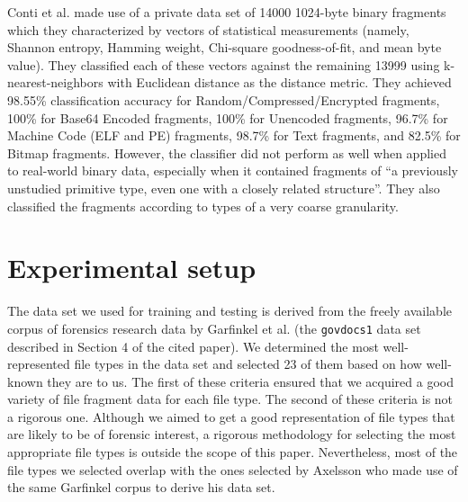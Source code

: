 \documentclass[letter,11pt]{article}
\begin{document}
Conti et al. \cite{Conti10} made use of a private data set of 14000 1024-byte binary fragments which they characterized by vectors of statistical measurements (namely, Shannon entropy, Hamming weight, Chi-square goodness-of-fit, and mean byte value). They classified each of these vectors against the remaining 13999 using k-nearest-neighbors with Euclidean distance as the distance metric. They achieved 98.55\% classification accuracy for Random/Compressed/Encrypted fragments, 100\% for Base64 Encoded fragments, 100\% for Unencoded fragments, 96.7\% for Machine Code (ELF and PE) fragments, 98.7\% for Text fragments, and 82.5\% for Bitmap fragments. However, the classifier did not perform as well when applied to real-world binary data, especially when it contained fragments of ``a previously unstudied primitive type, even one with a closely related structure''. They also classified the fragments according to types of a very coarse granularity.




\section{Experimental setup}
\label{Section:ExperimentalSetup}
The data set we used for training and testing is derived from the freely available corpus of forensics research data by Garfinkel et al. \cite{Garfinkel09} (the \texttt{govdocs1} data set described in Section 4 of the cited paper). We determined the most well-represented file types in the data set and selected 23 of them based on how well-known they are to us. The first of these criteria ensured that we acquired a good variety of file fragment data for each file type. The second of these criteria is not a rigorous one. Although we aimed to get a good representation of file types that are likely to be of forensic interest, a rigorous methodology for selecting the most appropriate file types is outside the scope of this paper. Nevertheless, most of the file types we selected overlap with the ones selected by Axelsson \cite{Axelsson10} who made use of the same Garfinkel corpus to derive his data set.
\end{document}
